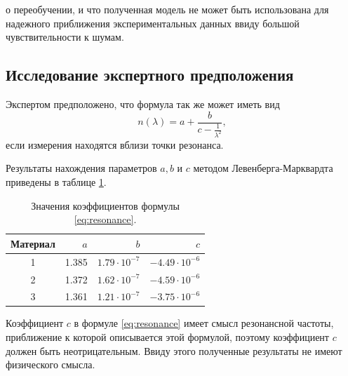 \documentclass[12pt,a4paper]{article}
\begin{document}
о переобучении, и что полученная модель не может быть
использована для надежного приближения экспериментальных данных ввиду большой чувствительности
к шумам.

\FloatBarrier

\subsection{Исследование экспертного предположения}

Экспертом предположено, что формула так же может иметь вид
\begin{equation}
  n(\lambda) = a + \frac{b}{c - \frac{1}{\lambda^2}},
  \label{eq:resonance}
\end{equation}
если измерения находятся вблизи точки резонанса.

Результаты нахождения параметров $a, b$ и $c$ методом Левенберга-Марквардта
приведены в таблице \ref{tabl:resonance_coeffs}.

\begin{table}[h]
  \centering
  \begin{tabular}{| c | r | r | r |} \hline
	Материал	& $a$		& $b$					& $c$					\\ \hline
	1			& 1.385		& $1.79 \cdot 10^{-7}$	& $-4.49 \cdot 10^{-6}$	\\ \hline
	2			& 1.372		& $1.62 \cdot 10^{-7}$	& $-4.59 \cdot 10^{-6}$	\\ \hline
	3			& 1.361		& $1.21 \cdot 10^{-7}$	& $-3.75 \cdot 10^{-6}$	\\ \hline
  \end{tabular}
  \caption{Значения коэффициентов формулы \eqref{eq:resonance}.}
  \label{tabl:resonance_coeffs}
\end{table}

Коэффициент $c$ в формуле \eqref{eq:resonance} имеет смысл резонансной
частоты, приближение к которой описывается этой формулой, поэтому коэффициент
$c$ должен быть неотрицательным. Ввиду этого полученные результаты не
имеют физического смысла.
\end{document}
